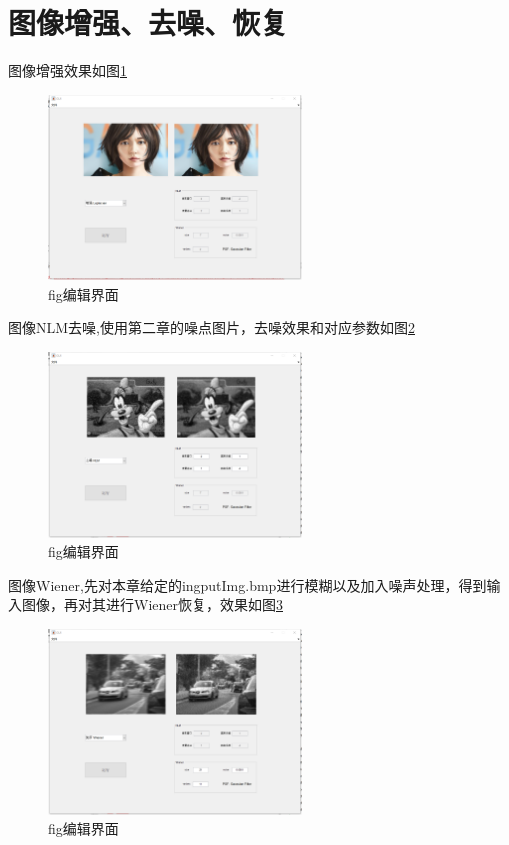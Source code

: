 \documentclass[lang=cn]{elegantpaper}
\begin{document}
\section{图像增强、去噪、恢复}
\par 图像增强效果如图\ref{fig:img5}
    \begin{figure}[htbp]
        \centering
        \includegraphics[width=0.6\textwidth]{img5.png}
        \caption{fig编辑界面\label{fig:img5}}
    \end{figure}

\par 图像NLM去噪,使用第二章的噪点图片，去噪效果和对应参数如图\ref{fig:img6}
    \begin{figure}[htbp]
        \centering
        \includegraphics[width=0.6\textwidth]{img6.png}
        \caption{fig编辑界面\label{fig:img6}}
    \end{figure}

\par 图像Wiener,先对本章给定的ingputImg.bmp进行模糊以及加入噪声处理，得到输入图像，再对其进行Wiener恢复，效果如图\ref{fig:img7}
    \begin{figure}[htbp]
        \centering
        \includegraphics[width=0.6\textwidth]{img7.png}
        \caption{fig编辑界面\label{fig:img7}}
    \end{figure}
\end{document}
